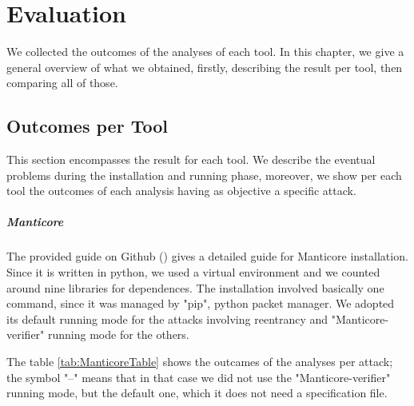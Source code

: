 
\chapter{Evaluation}
\label{ch:Evaluation}
We collected the outcomes of the analyses of each tool. 
In this chapter, we give a general overview of what we obtained, firstly,
describing the result per tool, then comparing all of those.

\section{Outcomes per Tool}
This section encompasses the result for each tool. 
We describe the eventual problems during the installation and running phase, moreover, we show per each tool the outcomes of each analysis having as objective a specific attack. 

\paragraph{Manticore} The provided guide on Github (\cite{ManticoreGitHub}) gives a detailed guide for Manticore installation. 
Since it is written in python, we used a virtual environment and we counted around nine libraries for dependences. The installation involved basically one command, since it was managed by "pip", python packet manager.
We adopted its default running mode for the attacks involving reentrancy and "Manticore-verifier" running mode for the others. 

The table \autoref*{tab:ManticoreTable} shows the outcames of the analyses per attack; the symbol "--" means that in that case we did not use the 
"Manticore-verifier" running mode, but the default one, which it does not need a specification file.


